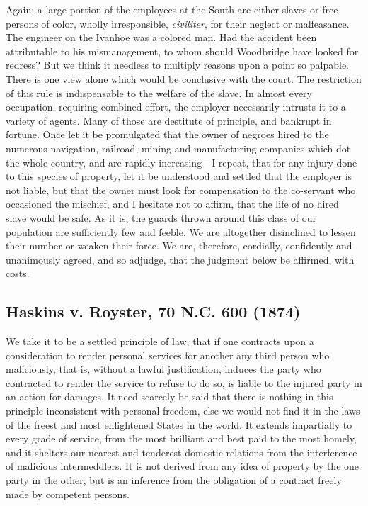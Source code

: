 \documentclass[
  letterpaper,
  11pt,
  DIV=9,
  openright]{scrbook}
\begin{document}
Again: a large portion of the employees at the South are either slaves
or free persons of color, wholly irresponsible, \emph{civiliter}, for
their neglect or malfeasance. The engineer on the Ivanhoe was a colored
man. Had the accident been attributable to his mismanagement, to whom
should Woodbridge have looked for redress? But we think it needless to
multiply reasons upon a point so palpable. There is one view alone which
would be conclusive with the court. The restriction of this rule is
indispensable to the welfare of the slave. In almost every occupation,
requiring combined effort, the employer necessarily intrusts it to a
variety of agents. Many of those are destitute of principle, and
bankrupt in fortune. Once let it be promulgated that the owner of
negroes hired to the numerous navigation, railroad, mining and
manufacturing companies which dot the whole country, and are rapidly
increasing---I repeat, that for any injury done to this species of
property, let it be understood and settled that the employer is not
liable, but that the owner must look for compensation to the co-servant
who occasioned the mischief, and I hesitate not to affirm, that the life
of no hired slave would be safe. As it is, the guards thrown around this
class of our population are sufficiently few and feeble. We are
altogether disinclined to lessen their number or weaken their force. We
are, therefore, cordially, confidently and unanimously agreed, and so
adjudge, that the judgment below be affirmed, with costs.


\subsection{Haskins v. Royster, 70 N.C. 600
(1874)}\label{haskins-v.-royster-70-n.c.-600-1874}

We take it to be a settled principle of law, that if one contracts upon
a consideration to render personal services for another any third person
who maliciously, that is, without a lawful justification, induces the
party who contracted to render the service to refuse to do so, is liable
to the injured party in an action for damages. It need scarcely be said
that there is nothing in this principle inconsistent with personal
freedom, else we would not find it in the laws of the freest and most
enlightened States in the world. It extends impartially to every grade
of service, from the most brilliant and best paid to the most homely,
and it shelters our nearest and tenderest domestic relations from the
interference of malicious intermeddlers. It is not derived from any idea
of property by the one party in the other, but is an inference from the
obligation of a contract freely made by competent persons.
\end{document}
